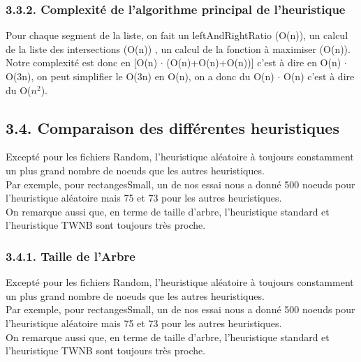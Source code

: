 \documentclass[a4paper,12pt]{report}	%
\begin{document}
    {\subsubsection*{3.3.2. Complexité de l'algorithme principal de l'heuristique}}
    Pour chaque segment de la liste, on fait un leftAndRightRatio (O(n)), un calcul de la liste des intersections (O(n)) , un calcul de la fonction à maximiser (O(n)). Notre complexité est donc en [O(n) $\cdot$ (O(n)+O(n)+O(n))] c'est à dire en O(n) $\cdot$ O(3n), on peut simplifier le O(3n) en O(n), on a donc du O(n) $\cdot$ O(n) c'est à dire du O($n^2$).\\
	
    
    {\subsection*{3.4. Comparaison des différentes heuristiques}}
      Excepté pour les fichiers Random, l'heuristique aléatoire à toujours constamment un plus grand nombre de noeuds que les autres heuristiques.\\
\indent Par exemple, pour rectangesSmall, un de nos essai nous a donné 500 noeuds pour l'heuristique aléatoire mais 75 et 73 pour les autres heuristiques.\\
\indent On remarque aussi que, en terme de taille d'arbre, l'heuristique standard et l'heuristique TWNB sont toujours très proche.\\
    
    {\subsubsection*{3.4.1. Taille de l'Arbre}}
      Excepté pour les fichiers Random, l'heuristique aléatoire à toujours constamment un plus grand nombre de noeuds que les autres heuristiques.\\
\indent Par exemple, pour rectangesSmall, un de nos essai nous a donné 500 noeuds pour l'heuristique aléatoire mais 75 et 73 pour les autres heuristiques.\\
\indent On remarque aussi que, en terme de taille d'arbre, l'heuristique standard et l'heuristique TWNB sont toujours très proche.\\
    
\end{document}
